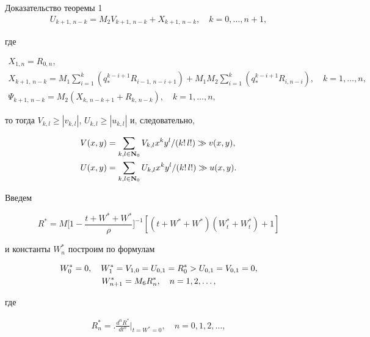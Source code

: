 \begin{pf*}{Доказательство теоремы 1}
\begin{gather*}
U_{k+1,\,n-k}=M_2V_{k+1,\,n-k}+X_{k+1,\,n-k},\quad k=0,\dotsc,n+1,


\end{gather*}


где


\begin{gather*}


X_{1,n}=R_{0,n},\\


X_{k+1,\,n-k}=M_1\sum^k_{i=1}(q^{k-i+1}_*R_{i-1,\,n-i+1})+


M_1M_2\sum^k_{i=1}(q^{k-i+1}_*R_{i,n-i}),\quad k=1,\dotsc,n,\\


\Psi_{k+1,\,n-k}=M_2(X_{k,\,n-k+1}+R_{k,\,n-k}),\quad k=1,\dotsc,n,


\end{gather*}


то тогда $V_{k,l}\ge|v_{k,l}|$, $U_{k,l}\ge|u_{k,l}|$ и, следовательно,


\begin{align*}


V(x,y)&=\sum_{k,l\in\bold N_0}V_{k,l}x^ky^l/(k!\,l!)\gg v(x,y),\\


U(x,y)&=\sum_{k,l\in\bold N_0}U_{k,l}x^ky^l/(k!\,l!)\gg u(x,y).


\end{align*}


Введем


$$


R^*=M\biggl[1-\frac{t+W^*+W^*}{\rho}\biggr]^{-1}


[(t+W^*+W^*)(W^*_t+W^*_t)+1]


$$


и константы $W^*_n$ построим по формулам


\begin{gather}


W^*_0=0,\quad W^*_1=V_{1,0}=U_{0,1}=R^*_0>U_{0,1}=V_{0,1}=0,\notag\\


W^*_{n+1}=M_6R^*_n,\quad n=1,2,\dotsc,


\end{gather}


где


\begin{gather*}


R^*_n=\biggl.\frac{d^nR^*}{dt^n}\biggr|_{t=W^*=0},\quad


n=0,1,2,\dotsc,\\



\end{gather*}
\end{pf*}
